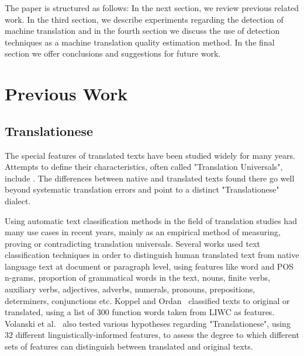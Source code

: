 \documentclass[11pt]{article}
\begin{document}
The paper is structured as follows: In the next section, we review previous related work. In the third section, we describe experiments regarding the detection of machine translation and in the fourth section we discuss the use of detection techniques as a machine translation quality estimation method. In the final section we offer conclusions and suggestions for future work.

\section{Previous Work}

\subsection{Translationese}
The special features of translated texts have been studied widely for many years. Attempts to define their characteristics, often called "Translation Universals", include \cite{toury2012,blumkalkalevenston1983,baker1993corpus,gellerstam1986}. The differences between native and translated texts found there go well beyond systematic translation errors and point to a distinct "Translationese" dialect.

Using automatic text classification methods in the field of translation studies had many use cases in recent years, mainly as an empirical method of measuring, proving or contradicting translation universals. Several works \cite{journals/lalc/BaroniB06,kurokawa2009,conf/cicling/IliseiIPM10} used text classification techniques in order to distinguish human translated text from native language text at document or paragraph level, using features like word and POS n-grams, proportion of grammatical words in the text, nouns, finite verbs, auxiliary verbs, adjectives, adverbs, numerals, pronouns, prepositions, determiners, conjunctions etc. %
Koppel and Ordan~ classified texts to original or translated, using a list of 300 function words taken from LIWC \cite{pennebaker2001linguistic} as features. %
Volanski et al.~ also tested various hypotheses regarding "Translationese", using 32 different linguistically-informed features, to assess the degree to which different sets of features can distinguish between translated and original texts. 
\end{document}
